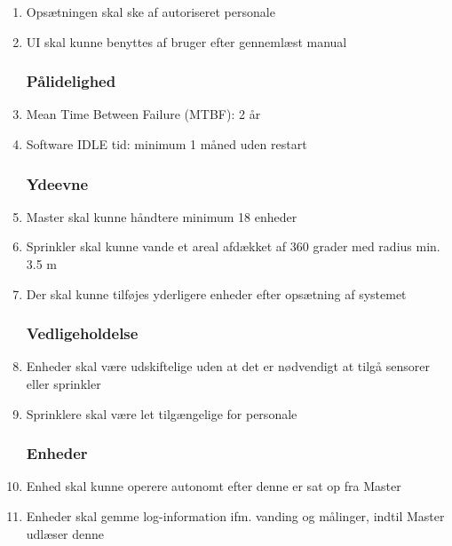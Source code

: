 \begin{enumerate}

\subsubsection*{Brugbarhed}
\item Opsætningen skal ske af autoriseret personale
\item UI skal kunne benyttes af bruger efter gennemlæst manual


\subsubsection*{Pålidelighed}
\item Mean Time Between Failure (MTBF): 2 år
\item Software IDLE tid: minimum 1 måned uden restart


\subsubsection*{Ydeevne}
\item Master skal kunne håndtere minimum 18 enheder
\item Sprinkler skal kunne vande et areal afdækket af 360 grader med radius min. 3.5 m 
\item Der skal kunne tilføjes yderligere enheder efter opsætning af systemet


\subsubsection*{Vedligeholdelse}
\item Enheder skal være udskiftelige uden at det er nødvendigt at tilgå sensorer eller sprinkler
\item Sprinklere skal være let tilgængelige for personale


\subsubsection*{Enheder}
\item Enhed skal kunne operere autonomt efter denne er sat op fra Master
\item Enheder skal gemme log-information ifm. vanding og målinger, indtil Master udlæser denne

\end{enumerate}

